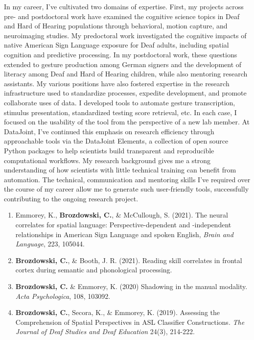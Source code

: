 \documentclass{nihbiosketch}
\begin{document}
\begin{statement}
In my career, I've cultivated two domains of expertise. First, my projects across pre-
and postdoctoral work have examined the cognitive science topics in Deaf and Hard of
Hearing populations through behavioral, motion capture, and neuroimaging studies. My
predoctoral work investigated the cognitive impacts of native American Sign Language
exposure for Deaf adults, including spatial cognition and predictive processing. In my
postdoctoral work, these questions extended to gesture production among German signers
and the development of literacy among Deaf and Hard of Hearing children, while also
mentoring research assistants. My various positions have also fostered expertise in the
research infrastructure used to standardize processes, expedite development, and promote
collaborate uses of data. I developed tools to automate gesture transcription, stimulus
presentation, standardized testing score retrieval, etc. In each case, I focused on the
usability of the tool from the perspective of a new lab member. At DataJoint, I've
continued this emphasis on research efficiency through approachable tools via the
DataJoint Elements, a collection of open source Python packages to help scientists build
transparent and reproducible computational workflows. My research background gives me a
strong understanding of how scientists with little technical training can benefit from
automation. The technical, communication and mentoring skills I've required over the
course of my career allow me to generate such user-friendly tools, successfully
contributing to the ongoing research project.

\begin{enumerate}

\item Emmorey, K., \textbf{Brozdowski, C.}, \& McCullough, S. (2021). The neural
        correlates for spatial language: Perspective-dependent and -independent
        relationships in American Sign Language and spoken English,
        \textit{Brain and Language}, 223, 105044.

\item \textbf{Brozdowski, C.}, \& Booth, J. R. (2021). Reading skill correlates in
        frontal cortex during semantic and phonological processing.

\item \textbf{Brozdowski, C.} \& Emmorey, K. (2020) Shadowing in the manual modality.
        \textit{Acta Psychologica}, 108, 103092.

\item \textbf{Brozdowski, C.}, Secora, K., \& Emmorey, K. (2019). Assessing the
        Comprehension of Spatial Perspectives in ASL Classifier Constructions.
        \textit{The Journal of Deaf Studies and Deaf Education} 24(3), 214-222.

\end{enumerate}

\end{statement}
\end{document}
